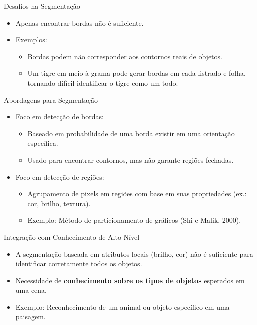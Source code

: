 \documentclass{beamer}
\begin{document}
\begin{frame}{Desafios na Segmentação}
    \begin{itemize}
        \item Apenas encontrar bordas não é suficiente.
        \item Exemplos:
        \begin{itemize}
            \item Bordas podem não corresponder aos contornos reais de objetos.
            \item Um tigre em meio à grama pode gerar bordas em cada listrado e folha, tornando difícil identificar o tigre como um todo.
        \end{itemize}
    \end{itemize}
\end{frame}

\begin{frame}{Abordagens para Segmentação}
    \begin{itemize}
        \item Foco em detecção de bordas:
        \begin{itemize}
            \item Baseado em probabilidade de uma borda existir em uma orientação específica.
            \item Usado para encontrar contornos, mas não garante regiões fechadas.
        \end{itemize}
        \item Foco em detecção de regiões:
        \begin{itemize}
            \item Agrupamento de pixels em regiões com base em suas propriedades (ex.: cor, brilho, textura).
            \item Exemplo: Método de particionamento de gráficos (Shi e Malik, 2000).
        \end{itemize}
    \end{itemize}
\end{frame}



\begin{frame}{Integração com Conhecimento de Alto Nível}
    \begin{itemize}
        \item A segmentação baseada em atributos locais (brilho, cor) não é suficiente para identificar corretamente todos os objetos.
        \item Necessidade de \textbf{conhecimento sobre os tipos de objetos} esperados em uma cena.
        \item Exemplo: Reconhecimento de um animal ou objeto específico em uma paisagem.
    \end{itemize}
\end{frame}
\end{document}
